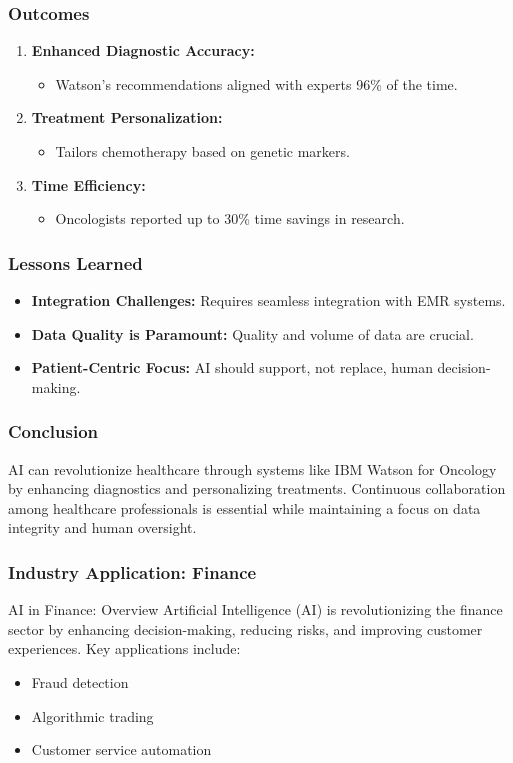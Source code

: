 \documentclass{beamer}
\begin{document}
\begin{frame}[fragile]
    \frametitle{Outcomes}
    \begin{enumerate}
        \item \textbf{Enhanced Diagnostic Accuracy:}
            \begin{itemize}
                \item Watson's recommendations aligned with experts 96\% of the time.
            \end{itemize}
        \item \textbf{Treatment Personalization:}
            \begin{itemize}
                \item Tailors chemotherapy based on genetic markers.
            \end{itemize}
        \item \textbf{Time Efficiency:}
            \begin{itemize}
                \item Oncologists reported up to 30\% time savings in research.
            \end{itemize}
    \end{enumerate}
\end{frame}

\begin{frame}[fragile]
    \frametitle{Lessons Learned}
    \begin{itemize}
        \item \textbf{Integration Challenges:} Requires seamless integration with EMR systems.
        \item \textbf{Data Quality is Paramount:} Quality and volume of data are crucial.
        \item \textbf{Patient-Centric Focus:} AI should support, not replace, human decision-making.
    \end{itemize}
\end{frame}

\begin{frame}[fragile]
    \frametitle{Conclusion}
    AI can revolutionize healthcare through systems like IBM Watson for Oncology by enhancing diagnostics and personalizing treatments. Continuous collaboration among healthcare professionals is essential while maintaining a focus on data integrity and human oversight.
\end{frame}

\begin{frame}[fragile]
    \frametitle{Industry Application: Finance}
    \begin{block}{AI in Finance: Overview}
        Artificial Intelligence (AI) is revolutionizing the finance sector by enhancing decision-making, reducing risks, and improving customer experiences. 
        Key applications include:
        \begin{itemize}
            \item Fraud detection
            \item Algorithmic trading
            \item Customer service automation
        \end{itemize}
    \end{block}
\end{frame}
\end{document}
